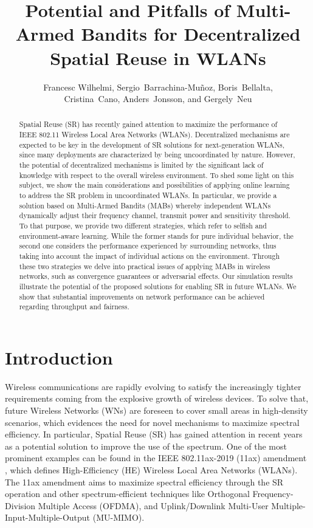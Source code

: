 \documentclass{article}
\begin{document}
\setcounter{page}{82}
\title{Potential and Pitfalls of Multi-Armed Bandits for Decentralized Spatial Reuse in WLANs}
\author{Francesc Wilhelmi, Sergio~Barrachina-Mu\~noz, Boris~Bellalta,\\ Cristina~Cano, Anders~Jonsson, and Gergely~Neu}
\date{ }
\maketitle
\begin{abstract}
Spatial Reuse (SR) has recently gained attention to maximize the performance of IEEE 802.11 Wireless Local Area Networks (WLANs). Decentralized mechanisms are expected to be key in the development of SR solutions for next-generation WLANs, since many deployments are characterized by being uncoordinated by nature. However, the potential of decentralized mechanisms is limited by the significant lack of knowledge with respect to the overall wireless environment. To shed some light on this subject, we show the main considerations and possibilities of applying online learning to address the SR problem in uncoordinated WLANs. In particular, we provide a solution based on Multi-Armed Bandits (MABs) whereby independent WLANs dynamically adjust their frequency channel, transmit power and sensitivity threshold. To that purpose, we provide two different strategies, which refer to selfish and environment-aware learning. While the former stands for pure individual behavior, the second one considers the performance experienced by surrounding networks, thus taking into account the impact of individual actions on the environment. Through these two strategies we delve into practical issues of applying MABs in wireless networks, such as convergence guarantees or adversarial effects. Our simulation results illustrate the potential of the proposed solutions for enabling SR in future WLANs. We show that substantial improvements on network performance can be achieved regarding throughput and fairness.
\end{abstract}

\section{Introduction}
\label{section:introduction}
Wireless communications are rapidly evolving to satisfy the increasingly tighter requirements coming from the explosive growth of wireless devices. To solve that, future Wireless Networks (WNs) are foreseen to cover small areas in high-density scenarios, which evidences the need for novel mechanisms to maximize spectral efficiency. In particular, Spatial Reuse (SR) has gained attention in recent years as a potential solution to improve the use of the spectrum. One of the most prominent examples can be found in the IEEE 802.11ax-2019 (11ax) amendment \cite{bellalta2016ax}, which defines High-Efficiency (HE) Wireless Local Area Networks (WLANs). The 11ax amendment aims to maximize spectral efficiency through the SR operation and other spectrum-efficient techniques like Orthogonal Frequency-Division Multiple Access (OFDMA), and Uplink/Downlink Multi-User Multiple-Input-Multiple-Output (MU-MIMO).
\end{document}
